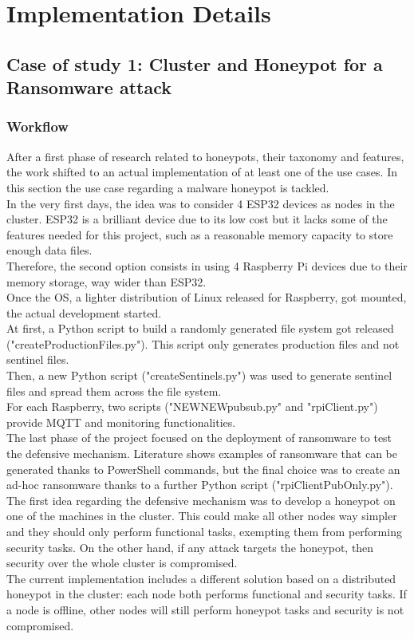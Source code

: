 \chapter{Implementation Details}
\section{Case of study 1: Cluster and Honeypot for a Ransomware attack}

\subsection{Workflow}

After a first phase of research related to honeypots, their taxonomy and features, the work shifted to an actual implementation of at least one of the use cases. In this section the use case regarding a malware honeypot is tackled.\\
In the very first days, the idea was to consider 4 ESP32 devices as nodes in the cluster. ESP32 is a brilliant device due to its low cost but it lacks some of the features needed for this project, such as a reasonable memory capacity to store enough data files.\\
Therefore, the second option consists in using 4 Raspberry Pi devices due to their memory storage, way wider than ESP32.\\
Once the OS, a lighter distribution of Linux released for Raspberry, got mounted, the actual development started.\\
At first, a Python script to build a randomly generated file system got released ("createProductionFiles.py"). This script only generates production files and not sentinel files.\\
Then, a new Python script ("createSentinels.py") was used to generate sentinel files and spread them across the file system.\\
For each Raspberry, two scripts ("NEWNEWpubsub.py" and "rpiClient.py") provide MQTT and monitoring functionalities.\\
The last phase of the project focused on the deployment of ransomware to test the defensive mechanism. Literature shows examples of ransomware that can be generated thanks to PowerShell commands, but the final choice was to create an ad-hoc ransomware thanks to a further Python script ("rpiClientPubOnly.py").\\
The first idea regarding the defensive mechanism was to develop a honeypot on one of the machines in the cluster. This could make all other nodes way simpler and they should only perform functional tasks, exempting them from performing security tasks. On the other hand, if any attack targets the honeypot, then security over the whole cluster is compromised.\\
The current implementation includes a different solution based on a distributed honeypot in the cluster: each node both performs functional and security tasks. If a node is offline, other nodes will still perform honeypot tasks and security is not compromised.


